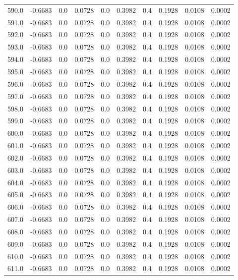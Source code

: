 \begin{longtable}{lrrrrrrrrr}
590.0 & -0.6683 & 0.0 & 0.0728 & 0.0 & 0.3982 & 0.4 & 0.1928 & 0.0108 & 0.0002 \\
591.0 & -0.6683 & 0.0 & 0.0728 & 0.0 & 0.3982 & 0.4 & 0.1928 & 0.0108 & 0.0002 \\
592.0 & -0.6683 & 0.0 & 0.0728 & 0.0 & 0.3982 & 0.4 & 0.1928 & 0.0108 & 0.0002 \\
593.0 & -0.6683 & 0.0 & 0.0728 & 0.0 & 0.3982 & 0.4 & 0.1928 & 0.0108 & 0.0002 \\
594.0 & -0.6683 & 0.0 & 0.0728 & 0.0 & 0.3982 & 0.4 & 0.1928 & 0.0108 & 0.0002 \\
595.0 & -0.6683 & 0.0 & 0.0728 & 0.0 & 0.3982 & 0.4 & 0.1928 & 0.0108 & 0.0002 \\
596.0 & -0.6683 & 0.0 & 0.0728 & 0.0 & 0.3982 & 0.4 & 0.1928 & 0.0108 & 0.0002 \\
597.0 & -0.6683 & 0.0 & 0.0728 & 0.0 & 0.3982 & 0.4 & 0.1928 & 0.0108 & 0.0002 \\
598.0 & -0.6683 & 0.0 & 0.0728 & 0.0 & 0.3982 & 0.4 & 0.1928 & 0.0108 & 0.0002 \\
599.0 & -0.6683 & 0.0 & 0.0728 & 0.0 & 0.3982 & 0.4 & 0.1928 & 0.0108 & 0.0002 \\
600.0 & -0.6683 & 0.0 & 0.0728 & 0.0 & 0.3982 & 0.4 & 0.1928 & 0.0108 & 0.0002 \\
601.0 & -0.6683 & 0.0 & 0.0728 & 0.0 & 0.3982 & 0.4 & 0.1928 & 0.0108 & 0.0002 \\
602.0 & -0.6683 & 0.0 & 0.0728 & 0.0 & 0.3982 & 0.4 & 0.1928 & 0.0108 & 0.0002 \\
603.0 & -0.6683 & 0.0 & 0.0728 & 0.0 & 0.3982 & 0.4 & 0.1928 & 0.0108 & 0.0002 \\
604.0 & -0.6683 & 0.0 & 0.0728 & 0.0 & 0.3982 & 0.4 & 0.1928 & 0.0108 & 0.0002 \\
605.0 & -0.6683 & 0.0 & 0.0728 & 0.0 & 0.3982 & 0.4 & 0.1928 & 0.0108 & 0.0002 \\
606.0 & -0.6683 & 0.0 & 0.0728 & 0.0 & 0.3982 & 0.4 & 0.1928 & 0.0108 & 0.0002 \\
607.0 & -0.6683 & 0.0 & 0.0728 & 0.0 & 0.3982 & 0.4 & 0.1928 & 0.0108 & 0.0002 \\
608.0 & -0.6683 & 0.0 & 0.0728 & 0.0 & 0.3982 & 0.4 & 0.1928 & 0.0108 & 0.0002 \\
609.0 & -0.6683 & 0.0 & 0.0728 & 0.0 & 0.3982 & 0.4 & 0.1928 & 0.0108 & 0.0002 \\
610.0 & -0.6683 & 0.0 & 0.0728 & 0.0 & 0.3982 & 0.4 & 0.1928 & 0.0108 & 0.0002 \\
611.0 & -0.6683 & 0.0 & 0.0728 & 0.0 & 0.3982 & 0.4 & 0.1928 & 0.0108 & 0.0002 \\

\end{longtable}
